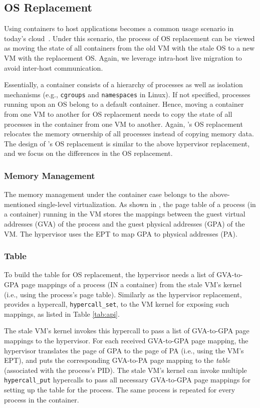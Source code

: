 \subsection{OS Replacement}
Using containers to host applications becomes a common usage scenario in today's cloud~\cite{aws, gcpkubernetes, azureks, ibmkubernetes, vmwarepks}. Under this scenario, the process of OS replacement can be viewed as moving the state of all containers from the old VM with the stale OS to a new VM with the replacement OS. Again, we leverage intra-host live migration to avoid inter-host communication.

Essentially, a container consists of a hierarchy of processes as well as isolation mechanisms (e.g., \texttt{cgroups} and \texttt{namespaces} in Linux). If not specified, processes running upon an OS belong to a default container. Hence, moving a container from one VM to another for OS replacement needs to copy the state of all processes in the container from one VM to another. Again, \arch's OS replacement relocates the memory ownership of all processes instead of copying memory data. The design of \arch's OS replacement is  similar to the above hypervisor replacement, and we focus on the differences in the OS replacement.

\subsubsection{Memory Management}
The memory management under the container case belongs to the above-mentioned single-level virtualization. As shown in , the page table of a process (in a container) running in the VM stores the mappings between the guest virtual addresses (GVA) of the process and the guest physical addresses (GPA) of the VM. The hypervisor uses the EPT to map GPA to physical addresses (PA). 

\subsubsection{\arch Table}
To build the \arch table for OS replacement, the hypervisor needs a list of GVA-to-GPA page mappings of a process (IN a container) from the stale VM's kernel (i.e., using the process's page table). Similarly as the hypervisor replacement, \arch provides a hypercall, \texttt{hypercall\_set}, to the VM kernel for exposing such mappings, as listed in Table \ref{tab:api}. 

The stale VM's kernel invokes this hypercall to pass a list of GVA-to-GPA page mappings to the hypervisor. For each received GVA-to-GPA page mapping, the hypervisor translates the page of GPA to the page of PA (i.e., using the VM's EPT), and puts the corresponding GVA-to-PA page mapping to the {\em \arch table} (associated with the process's PID). The stale VM's kernel can invoke multiple \texttt{hypercall\_put} hypercalls to pass all necessary GVA-to-GPA page mappings for setting up the \arch table for the process. The same process is repeated for every process in the container. 

